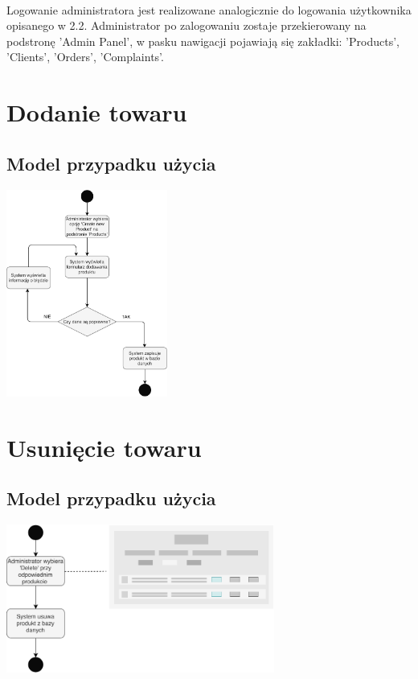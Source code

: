 \documentclass[12pt]{report}
\begin{document}
			\paragraph{} Logowanie administratora jest realizowane analogicznie do logowania użytkownika opisanego w 2.2. Administrator po zalogowaniu zostaje przekierowany na podstronę 'Admin Panel', w pasku nawigacji pojawiają się zakładki: 'Products', 'Clients', 'Orders', 'Complaints'.
		
		
	\section{Dodanie towaru}
		\subsection{Model przypadku użycia}
			\begin{center}
				\includegraphics[width=150pt]{admin_dodaj.pdf}
			\end{center}
	
	\section{Usunięcie towaru}
		\subsection{Model przypadku użycia}
			\begin{center}
				\includegraphics[width=250pt]{usun.pdf}
			\end{center}
	
\end{document}
